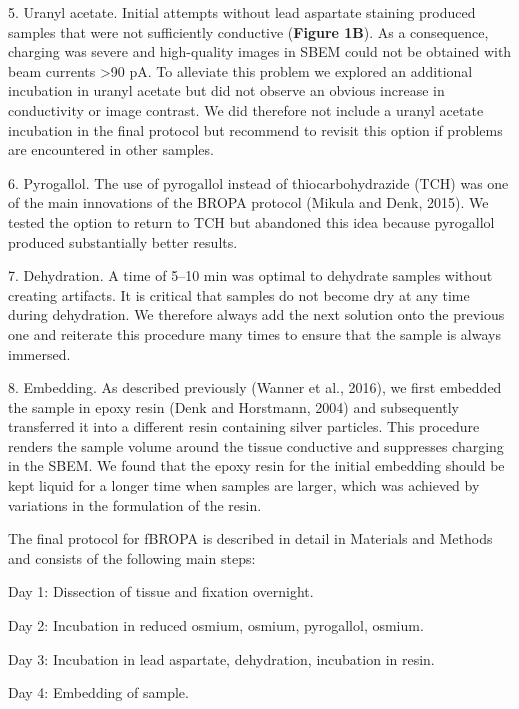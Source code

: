 \documentclass{article}
\newenvironment{steplist}{\par\setlength{\parindent}{0pt}\everypar{\hangindent=1.6em\hangafter=1\relax}}{\par\smallskip}
\begin{document}
\begin{steplist}
5. Uranyl acetate. Initial attempts without lead aspartate staining produced samples that were not sufficiently conductive (\textbf{Figure 1B}). As a consequence, charging was severe and high-quality images in SBEM could not be obtained with beam currents >90 pA. To alleviate this problem we explored an additional incubation in uranyl acetate but did not observe an obvious increase in conductivity or image contrast. We did therefore not include a uranyl acetate incubation in the final protocol but recommend to revisit this option if problems are encountered in other samples.

6. Pyrogallol. The use of pyrogallol instead of thiocarbohydrazide (TCH) was one of the main innovations of the BROPA protocol (Mikula and Denk, 2015). We tested the option to return to TCH but abandoned this idea because pyrogallol produced substantially better results.

7. Dehydration. A time of 5–10 min was optimal to dehydrate samples without creating artifacts. It is critical that samples do not become dry at any time during dehydration. We therefore always add the next solution onto the previous one and reiterate this procedure many times to ensure that the sample is always immersed.

8. Embedding. As described previously (Wanner et al., 2016), we first embedded the sample in epoxy resin (Denk and Horstmann, 2004) and subsequently transferred it into a different resin containing silver particles. This procedure renders the sample volume around the tissue conductive and suppresses charging in the SBEM. We found that the epoxy resin for the initial embedding should be kept liquid for a longer time when samples are larger, which was achieved by variations in the formulation of the resin.
\end{steplist}

The final protocol for fBROPA is described in detail in Materials and Methods and consists of the following main steps:

\begin{steplist}
Day 1: Dissection of tissue and fixation overnight.

Day 2: Incubation in reduced osmium, osmium, pyrogallol, osmium.

Day 3: Incubation in lead aspartate, dehydration, incubation in resin.

Day 4: Embedding of sample.
\end{steplist}
\end{document}
